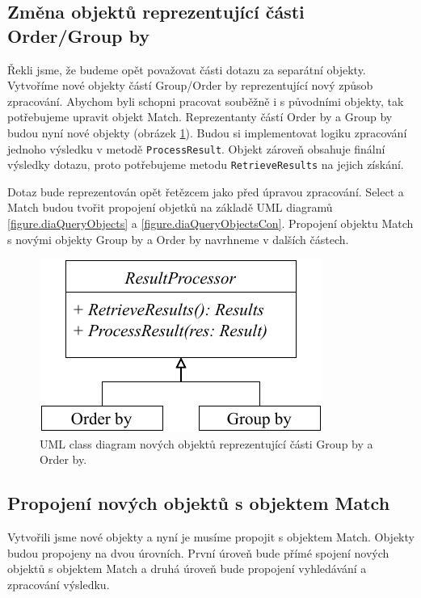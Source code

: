\subsection{Změna objektů reprezentující části Order/Group by}

Řekli jsme, že budeme opět považovat části dotazu za separátní objekty.
Vytvoříme nové objekty částí Group/Order by reprezentující nový způsob zpracování.
Abychom byli schopni pracovat souběžně i s původními objekty, tak potřebujeme upravit objekt Match.
Reprezentanty částí Order by a Group by budou nyní nové objekty (obrázek \ref{figure.diaStreamedResultProcessor}).
Budou si implementovat logiku zpracování jednoho výsledku v metodě \texttt{ProcessResult}.
Objekt zároveň obsahuje finální výsledky dotazu, proto potřebujeme metodu \texttt{RetrieveResults} na jejich získání.

Dotaz bude reprezentován opět řetězcem jako před úpravou zpracování.
Select a Match budou tvořit propojení objetků na základě UML diagramů \ref{figure.diaQueryObjects} a \ref{figure.diaQueryObjectsCon}.
Propojení objektu Match s novými objekty Group by a Order by navrhneme v dalších částech.

\begin{figure}[!htp]
\includegraphics{../img/diaStreamedResultProcessor.pdf}\centering
\caption{UML class diagram nových objektů reprezentující části Group by a Order by.}
\label{figure.diaStreamedResultProcessor}
\end{figure}

\subsection{Propojení nových objektů s objektem Match}

Vytvořili jsme nové objekty a nyní je musíme propojit s objektem Match.
Objekty budou propojeny na dvou úrovních.
První úroveň bude přímé spojení nových objektů s objektem Match a druhá úroveň bude propojení vyhledávání a zpracování výsledku.

